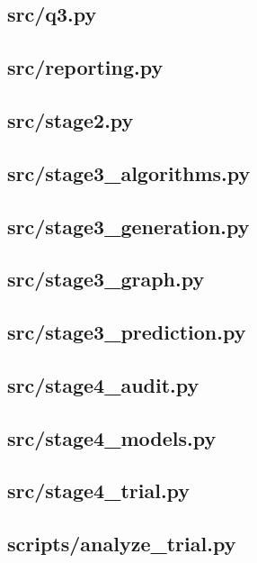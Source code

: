 \documentclass{mathorcup-journal}
\begin{document}
\subsection*{src/q3.py}

\subsection*{src/reporting.py}

\subsection*{src/stage2.py}

\subsection*{src/stage3\_algorithms.py}

\subsection*{src/stage3\_generation.py}

\subsection*{src/stage3\_graph.py}

\subsection*{src/stage3\_prediction.py}

\subsection*{src/stage4\_audit.py}

\subsection*{src/stage4\_models.py}

\subsection*{src/stage4\_trial.py}

\subsection*{scripts/analyze\_trial.py}

\end{document}
